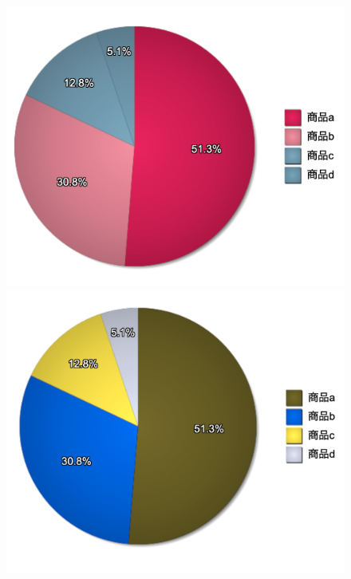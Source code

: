 \begin{figure}[H]
\begin{minipage}[b]{.30\textwidth}
    \end{minipage}
    \begin{minipage}[b]{.30\textwidth}
        \centering
        \includegraphics[keepaspectratio,width=\textwidth]{../../10_UniversalDesign/no2_circle_CC_T.png}
    \end{minipage}
    \begin{minipage}[b]{.30\textwidth}
        \centering
        \includegraphics[keepaspectratio,width=\textwidth]{../../10_UniversalDesign/no2_circle_RC_P.png}

\end{minipage}
\end{figure}
